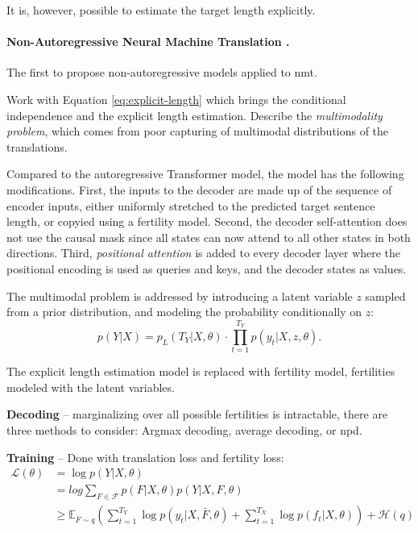 It is, however, possible to estimate the target length explicitly.

\citep{ghazvininejad2019mask} \citep{mansimov2019generalized}



\paragraph{Non-Autoregressive Neural Machine Translation
  \citep{gu2017nonautoregressive}.} The first to propose non-autoregressive
models applied to \gls{nmt}.

Work with Equation \ref{eq:explicit-length} which brings the conditional
independence and the explicit length estimation. Describe the
\emph{multimodality problem}, which comes from poor capturing of multimodal
distributions of the translations.

Compared to the autoregressive Transformer model, the model has the following
modifications. First, the inputs to the decoder are made up of the sequence of
encoder inputs, either uniformly stretched to the predicted target sentence
length, or copyied using a fertility model. Second, the decoder self-attention
does not use the causal mask since all states can now attend to all other states
in both directions. Third, \emph{positional attention} is added to every decoder
layer where the positional encoding is used as queries and keys, and the decoder
states as values.

The multimodal problem is addressed by introducing a latent variable $z$ sampled
from a prior distribution, and modeling the probability conditionally on $z$:
\begin{equation}
  p(Y|X) = p_L(T_Y|X, \theta) \cdot \prod_{t=1}^{T_Y}p(y_t|X, z, \theta).
\end{equation}

The explicit length estimation model is replaced with fertility model,
fertilities modeled with the latent variables.

\textbf{Decoding} -- marginalizing over all possible fertilities is intractable,
there are three methods to consider: Argmax decoding, average decoding, or
\gls{npd}.

\textbf{Training} -- Done with translation loss and fertility loss:
\begin{align}
  \mathcal{L}(\theta)  & = \log p(Y|X, \theta) \\
                       & = log \sum_{F \in \mathcal{F}} p(F| X, \theta ) p(Y | X, F, \theta) \\
                       & \geq \mathbb{E}_{\bar{F} \sim q}
                         \left(
                         \sum_{t=1}^{T_Y} \log p(y_t | X, \bar{F}, \theta)
                         + \sum_{t=1}^{T_X} \log p(f_t | X, \theta)
                         \right)
                         + \mathcal{H}(q)
\end{align}

